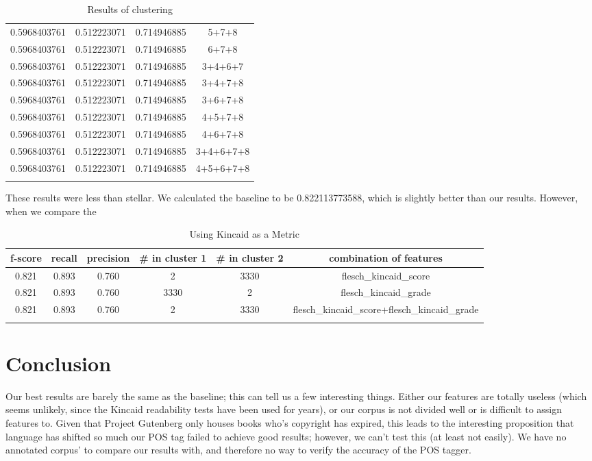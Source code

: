 \documentclass[]{article}
\begin{document}
\begin{longtable}{| c | c | c | c |}
		0.5968403761 & 0.512223071 & 0.714946885 & 5+7+8 \\
		0.5968403761 & 0.512223071 & 0.714946885 & 6+7+8 \\
		0.5968403761 & 0.512223071 & 0.714946885 & 3+4+6+7 \\
		0.5968403761 & 0.512223071 & 0.714946885 & 3+4+7+8 \\
		0.5968403761 & 0.512223071 & 0.714946885 & 3+6+7+8 \\
		0.5968403761 & 0.512223071 & 0.714946885 & 4+5+7+8 \\
		0.5968403761 & 0.512223071 & 0.714946885 & 4+6+7+8 \\
		0.5968403761 & 0.512223071 & 0.714946885 & 3+4+6+7+8 \\
		0.5968403761 & 0.512223071 & 0.714946885 & 4+5+6+7+8 \\
		\hline
	\caption{Results of clustering}
	\label{table:features2}
\end{longtable}

These results were less than stellar.
We calculated the baseline to be 0.822113773588, which is slightly better than our results.
However, when we compare the 

\begin{longtable}{| c | c | c | c | c | c |} \hline
	f-score & recall & precision & \# in cluster 1 & \# in cluster 2 & combination of features \\
	\hline
0.821 & 0.893 & 0.760 & 2 & 3330 & flesch\_kincaid\_score \\
0.821 & 0.893 & 0.760 & 3330 & 2 & flesch\_kincaid\_grade \\
0.821 & 0.893 & 0.760 & 2 & 3330 & flesch\_kincaid\_score+flesch\_kincaid\_grade \\
\hline
	\caption{Using Kincaid as a Metric}
	\label{table:kincaid_clustering}
\end{longtable}


\section{Conclusion}

Our best results are barely the same as the baseline; this can tell us a few interesting things.
Either our features are totally useless (which seems unlikely, since the Kincaid readability tests have been used for years), or our corpus is not divided well or is difficult to assign features to.
Given that Project Gutenberg only houses books who's copyright has expired, this leads to the interesting proposition that language has shifted so much our POS tag failed to achieve good results; however, we can't test this (at least not easily).
We have no annotated corpus' to compare our results with, and therefore no way to verify the accuracy of the POS tagger.
\end{document}
